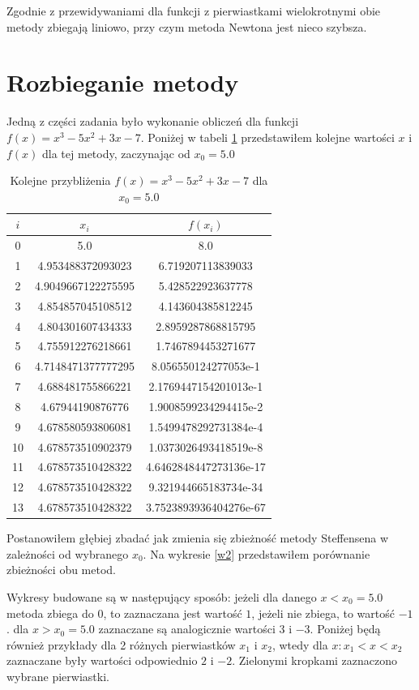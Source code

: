 \documentclass{article}
\begin{document}
Zgodnie z przewidywaniami dla funkcji z pierwiastkami wielokrotnymi obie metody zbiegają liniowo, przy czym metoda Newtona jest nieco szybsza.

\section{Rozbieganie metody}
Jedną z części zadania było wykonanie obliczeń dla funkcji $f(x)=x^3-5x^2+3x -7$. 
Poniżej w tabeli \ref{t1} przedstawiłem kolejne wartości $x$ i $f(x)$ dla tej metody, zaczynając od $x_0=5.0$

\begin{table}[h]
    \centering
    \begin{tabular}{|c|c|c|} 
    \hline
    	$i$ &$x_i$&$f(x_i)$\\\hline
        0 & 5.0 & 8.0 \\
        1 & 4.953488372093023 & 6.719207113839033 \\
        2 & 4.9049667122275595 & 5.428522923637778 \\
        3 & 4.854857045108512 & 4.143604385812245 \\
        4 & 4.804301607434333 & 2.8959287868815795 \\
        5 & 4.755912276218661 & 1.7467894453271677 \\
        6 & 4.7148471377777295 & 8.056550124277053e-1 \\
        7 & 4.688481755866221 & 2.1769447154201013e-1 \\
        8 & 4.67944190876776 & 1.9008599234294415e-2 \\
        9 & 4.678580593806081 & 1.5499478292731384e-4 \\
        10 & 4.678573510902379 & 1.0373026493418519e-8 \\
        11 & 4.678573510428322 & 4.6462848447273136e-17 \\
        12 & 4.678573510428322 & 9.321944665183734e-34 \\
        13 & 4.678573510428322 & 3.7523893936404276e-67 \\
 		\hline
    \end{tabular}
    \caption{Kolejne przybliżenia $f(x)=x^3-5x^2+3x -7$ dla $x_0=5.0$}
	\label{t1}
\end{table}
Postanowiłem głębiej zbadać jak zmienia się zbieżność metody Steffensena w zależności od wybranego $x_0$. Na wykresie \ref{w2} przedstawiłem porównanie zbieżności obu metod. 

Wykresy budowane są w następujący sposób: jeżeli dla danego $x < x_0=5.0$ metoda zbiega do $0$, to zaznaczana jest wartość $1$, jeżeli nie zbiega, to wartość $-1$. dla $x > x_0=5.0$ zaznaczane są analogicznie wartości $3$ i $-3$. Poniżej będą również przykłady dla 2 różnych pierwiastków $x_1$ i $x_2$, wtedy dla $x: x_1<x<x_2$ zaznaczane były wartości odpowiednio $2$ i $-2$. Zielonymi kropkami zaznaczono wybrane pierwiastki.
\end{document}

